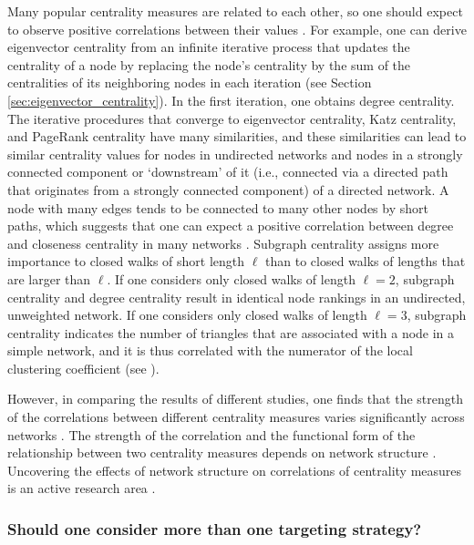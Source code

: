 \documentclass{comnet-mod}
\begin{document}
Many popular centrality measures are related to each other, so one should expect to observe positive correlations between their values \cite{Estrada2005, Newman2018}. For example, one can derive eigenvector centrality from an infinite iterative process that updates the centrality of a node by replacing the node's centrality by the sum of the centralities of its neighboring nodes in each iteration (see Section \ref{sec:eigenvector_centrality}). In the first iteration, one obtains degree centrality. The iterative procedures that converge to eigenvector centrality, Katz centrality, and PageRank centrality have many similarities, and these similarities can lead to similar centrality values for nodes in undirected networks and nodes in a strongly connected component or `downstream' of it (i.e., connected via a directed path that originates from a strongly connected component) of a directed network. 
A node with many edges tends to be connected to many other nodes by short paths, which suggests that one can expect a positive correlation between degree and closeness centrality in many networks \cite[p.\,171]{Newman2018}. Subgraph centrality assigns more importance to closed walks of short length $\ell$ than to closed walks of lengths that are larger than $\ell$. If one considers only closed walks of length $\ell = 2$, subgraph centrality and degree centrality result in identical node rankings in an undirected, unweighted network. If one considers only closed walks of length $\ell = 3$, subgraph centrality indicates the number of triangles that are associated with a node in a simple network, and it is thus correlated with the numerator of the local clustering coefficient (see ).

However, in comparing the results of different studies, one finds that the strength of the correlations between different centrality measures varies significantly across networks \cite{Wacker2020}. The strength of the correlation and the functional form of the relationship between two centrality measures depends on network structure \cite{Holme2002, Valente2008}. Uncovering the effects of network structure on correlations of centrality measures is an active research area \cite{Chung2012, Iyer2013, Zhang2013, Jackson2014, Nomikos2014, Li2015b, Niu2015, Bloch2017, Oldham2019, Wacker2020, Bloch2023}.


\subsubsection{Should one consider more than one targeting strategy?}
\end{document}
